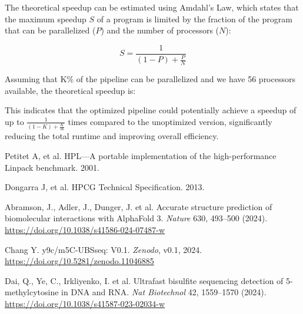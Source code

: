 \documentclass[a4paper,12pt]{article}
\begin{document}
The theoretical speedup can be estimated using Amdahl's Law, which states that the maximum speedup \(S\) of a program is limited by the fraction of the program that can be parallelized (\(P\)) and the number of processors (\(N\)):

\begin{equation}
S = \frac{1}{(1 - P) + \frac{P}{N}}
\end{equation}

Assuming that K\% of the pipeline can be parallelized and we have 56 processors available, the theoretical speedup is:

This indicates that the optimized pipeline could potentially achieve a speedup of up to $\frac{1}{(1 - K) + \frac{K}{56}}$ times compared to the unoptimized version, significantly reducing the total runtime and improving overall efficiency.

\newpage

\begin{thebibliography}{9}

Petitet A, et al. HPL—A portable implementation of the high-performance Linpack benchmark. 2001.

Dongarra J, et al. HPCG Technical Specification. 2013.

Abramson, J., Adler, J., Dunger, J. et al. Accurate structure prediction of biomolecular interactions with AlphaFold 3. \textit{Nature} 630, 493–500 (2024). \url{https://doi.org/10.1038/s41586-024-07487-w}

Chang Y. y9c/m5C-UBSseq: V0.1. \textit{Zenodo}, v0.1, 2024. \url{https://doi.org/10.5281/zenodo.11046885}

Dai, Q., Ye, C., Irkliyenko, I. et al. Ultrafast bisulfite sequencing detection of 5-methylcytosine in DNA and RNA. \textit{Nat Biotechnol} 42, 1559–1570 (2024). \url{https://doi.org/10.1038/s41587-023-02034-w}
\end{thebibliography}
\newpage
\end{document}

